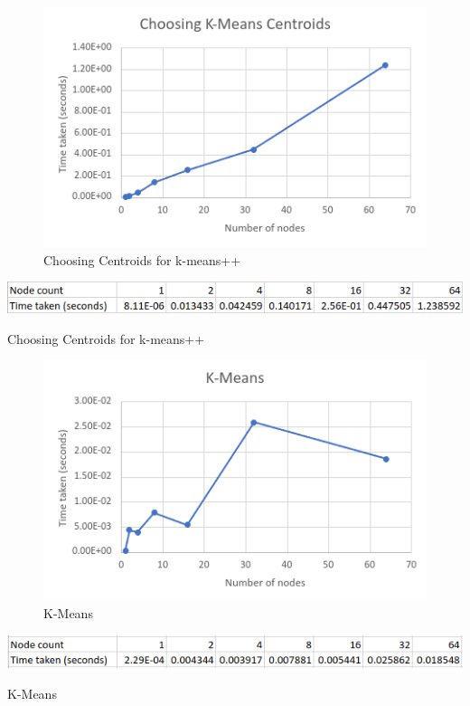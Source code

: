 \documentclass{article}
\begin{document}
\clearpage
\begin{figure}[!htb]
\includegraphics[width=\textwidth]{choose-centroids.png}
\caption{Choosing Centroids for k-means++}
\label{fig:2}
\end{figure}
\begin{table}[!htb]
\includegraphics[width=\textwidth]{choose-centroids-table.png}
\caption{Choosing Centroids for k-means++}
\label{tab:2}
\end{table}

\clearpage
\begin{figure}[!htb]
\includegraphics[width=\textwidth]{k-means.png}
\caption{K-Means}
\label{fig:3}
\end{figure}
\begin{table}[!htb]
\includegraphics[width=\textwidth]{k-means-table.png}
\caption{K-Means}
\label{tab:3}
\end{table}
\end{document}
